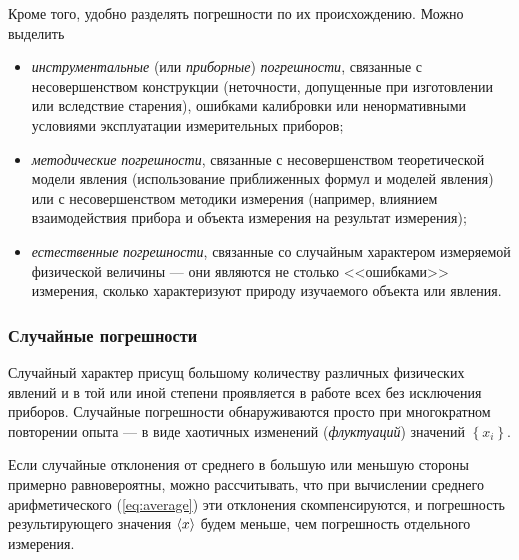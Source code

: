 Кроме того, удобно разделять погрешности по их происхождению. Можно
выделить
\begin{itemize}
    \item \emph{инструментальные} (или \emph{приборные}) \emph{погрешности},
связанные с несовершенством конструкции (неточности, допущенные при
изготовлении или вследствие старения), ошибками калибровки или ненормативными
условиями эксплуатации измерительных приборов;
    \item \emph{методические} \emph{погрешности}, связанные с несовершенством
теоретической модели явления (использование приближенных формул и
моделей явления) или с несовершенством методики измерения (например,
влиянием взаимодействия прибора и объекта измерения на результат измерения);
    \item \emph{естественные} \emph{погрешности}, связанные со случайным
характером
измеряемой физической величины --- они являются не столько
<<ошибками>> измерения, сколько характеризуют
природу изучаемого объекта или явления.
\end{itemize}


\subsubsection{Случайные погрешности}

Случайный характер присущ большому количеству различных физических
явлений и в той или иной степени проявляется в работе всех без исключения
приборов. Случайные погрешности обнаруживаются просто при многократном
повторении опыта --- в виде хаотичных изменений (\emph{флуктуаций})
значений $\left\{ x_{i}\right\} $.

Если случайные отклонения от среднего в большую или меньшую стороны
примерно равновероятны, можно рассчитывать, что при вычислении среднего
арифметического (\ref{eq:average}) эти отклонения скомпенсируются,
и погрешность результирующего значения $\left<x\right>$ будем меньше,
чем погрешность отдельного измерения.


